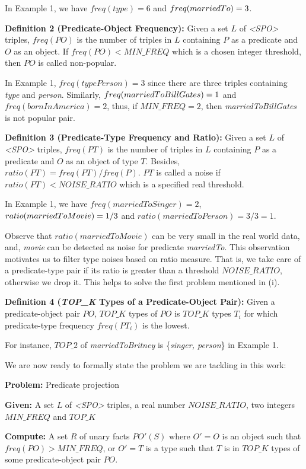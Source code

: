 \documentclass{acm_proc_article-sp}
\begin{document}
In Example 1, we have $freq(type) = 6$ and $freq(marriedTo)\\ = 3$.

\textbf{Definition 2 (Predicate-Object Frequency):} Given a set $L$ of \textit{<SPO>} triples, $freq(PO)$ is the number of triples in $L$ containing $P$ as a predicate and $O$ as an object. If $freq(PO) < MIN\_FREQ$ which is a chosen integer threshold, then $PO$ is called non-popular.

In Example 1, $freq(typePerson) = 3$ since there are three triples containing \textit{type} and \textit{person}. Similarly, $freq(married\\ToBillGates) = 1$ and $freq(bornInAmerica) = 2$, thus, if $MIN\_FREQ = 2$, then \textit{marriedToBillGates} is not popular pair.

\textbf{Definition 3 (Predicate-Type Frequency and Ratio):} Given a set $L$ of \textit{<SPO>} triples, $freq(PT)$ is the number of triples in $L$ containing $P$ as a predicate and $O$ as an object of type $T$. Besides, $ratio(PT) = freq(PT) / freq(P)$. $PT$ is called a noise if $ratio(PT) < NOISE\_RATIO$ which is a specified real threshold.

In Example 1, we have $freq(marriedToSinger) = 2$, $ratio\\(marriedToMovie) = 1 / 3$ and $ratio(marriedToPerson) = 3 / 3 = 1$.

Observe that $ratio(marriedToMovie)$ can be very small in the real world data, and, \textit{movie} can be detected as noise for predicate \textit{marriedTo}. This observation motivates us to filter type noises based on ratio measure. That is, we take care of a predicate-type pair if its ratio is greater than a threshold $NOISE\_RATIO$, otherwise we drop it. This helps to solve the first problem mentioned in (i).

\textbf{Definition 4 (\textit{TOP\_K} Types of a Predicate-Object Pair):} Given a predicate-object pair $PO$, $TOP\_K$ types of $PO$ is $TOP\_K$ types $T_{i}$ for which predicate-type frequency $freq(PT_{i})$ is the lowest.

For instance, $TOP\_2$ of \textit{marriedToBritney} is \{\textit{singer, person}\} in Example 1.

We are now ready to formally state the problem we are tackling in this work:

\begin{framed}
\textbf{Problem:} Predicate projection

\textbf{Given:} A set $L$ of \textit{<SPO>} triples, a real number $NOISE\_RATIO$, two integers $MIN\_FREQ$ and $TOP\_K$

\textbf{Compute:} A set $R$ of unary facts $PO'(S)$ where $O' = O$ is an object such that $freq(PO) > MIN\_FREQ$, or $O' = T$ is a type such that $T$ is in $TOP\_K$ types of some predicate-object pair $PO$.
\end{framed}
\end{document}
